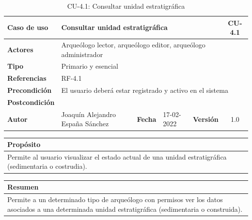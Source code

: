     \begin{table}[H]
    \begin{center}
        \begin{adjustbox}{width=\textwidth}
        \begin{tabular}{ | l | l | l | l | c | c | } 
            \hline
            \textbf{Caso de uso} & \multicolumn{4}{l|}{Consultar unidad estratigráfica} & \cellcolor{gray!50} \textbf{CU-4.1}\\
            \hline
            \textbf{Actores} & \multicolumn{5}{p{0.9\linewidth}|}{Arqueólogo lector, arqueólogo editor, arqueólogo administrador} \\
            \hline
            \textbf{Tipo} & \multicolumn{5}{l|}{Primario y esencial} \\
            \hline
            \textbf{Referencias} & \multicolumn{3}{l|}{RF-4.1} & \multicolumn{2}{l|}{ }\\
            \hline
            \textbf{Precondición} & \multicolumn{5}{l|}{El usuario deberá estar registrado y activo en el sistema} \\
            \hline
            \textbf{Postcondición} & \multicolumn{5}{l|}{ } \\
            \hline
            \textbf{Autor} & \multicolumn{1}{p{0.25\linewidth}|}{Joaquín Alejandro España Sánchez} & \textbf{Fecha} & 
            17-02-2022     & \textbf{Versión}                                                      & 1.0\\
            \hline
        \end{tabular}
        \end{adjustbox}
        \caption{CU-4.1: Consultar unidad estratigráfica}
        \label{tab:consult-ue}
    \end{center}
    \end{table}


    \begin{table}[H]
        \centering
        \begin{tabularx}{\textwidth}{@{} |L |@{}} \hline
            \textbf{Propósito} \\
            \hline
            Permite al usuario visualizar el estado actual de una unidad estratigráfica
            (sedimentaria o costrudia). \\
            \hline
        \end{tabularx}
    \end{table}

    \begin{table}[H]
        \centering
        \begin{tabularx}{\textwidth}{@{} |L |@{}} \hline
            \textbf{Resumen} \\
            \hline
            Permite a un determinado tipo de arqueólogo con permisos ver los datos asociados
            a una determinada unidad estratigráfica (sedimentaria o construida). \\
            \hline
        \end{tabularx}
    \end{table}


